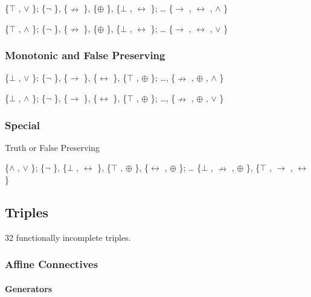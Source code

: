 \{$\top$ , $\lor$ \}; \{$\neg$ \}, \{$\nrightarrow$ \}, \{$\oplus$ \}, \{$\bot$ , $\leftrightarrow$ \}; \ldots{} \{$\to$ , $\leftrightarrow$ , $\land$ \}

\{$\top$ , $\land$ \}; \{$\neg$ \}, \{$\nrightarrow$ \}, \{$\oplus$ \}, \{$\bot$ , $\leftrightarrow$ \}; \ldots{} \{$\to$ , $\leftrightarrow$ , $\lor$ \}

\hypertarget{monotonic-and-false-preserving}{%
\subsubsection{Monotonic and False
Preserving}\label{monotonic-and-false-preserving}}

\{$\bot$ , $\lor$ \}; \{$\neg$ \}, \{$\to$ \}, \{$\leftrightarrow$ \}, \{$\top$ , $\oplus$ \}; \ldots, \{$\nrightarrow$ , $\oplus$ , $\land$ \}

\{$\bot$ , $\land$ \}; \{$\neg$ \}, \{$\to$ \}, \{$\leftrightarrow$ \}, \{$\top$ , $\oplus$ \}; \ldots, \{$\nrightarrow$ , $\oplus$ , $\lor$ \}

\hypertarget{section}{%
\subsubsection{}\label{section}}

\hypertarget{special}{%
\subsubsection{Special}\label{special}}

Truth or False Preserving

\{$\land$ , $\lor$ \}; \{$\neg$ \}, \{$\bot$ , $\leftrightarrow$ \}, \{$\top$ , $\oplus$ \}, \{$\leftrightarrow$ , $\oplus$ \}; \ldots{} \{$\bot$ , $\nrightarrow$ , $\oplus$ \},
\{$\top$ , $\to$ , $\leftrightarrow$ \}

\hypertarget{triples-1}{%
\subsection{Triples}\label{triples-1}}

32 functionally incomplete triples.

\hypertarget{affine-connectives}{%
\subsubsection{Affine Connectives}\label{affine-connectives}}

\hypertarget{generators-1}{%
\paragraph{Generators}\label{generators-1}}

